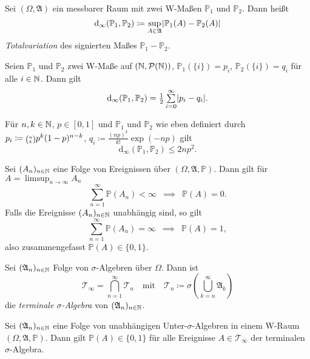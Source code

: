 \documentclass{cheat-sheet}
\newcommand{\Alg}{\mathfrak{A}} %
\renewcommand{\P}{\mathbb{P}} %
\let\myBinom\binom
\renewcommand{\binom}[2]{\mathsmaller{\myBinom{#1}{#2}}}
\begin{document}

\begin{defn}
  Sei $(\Omega, \Alg)$ ein messbarer Raum mit zwei W-Maßen $\P_1$ und $\P_2$. Dann heißt
  \[ \mathrm{d}_\infty(\P_1, \P_2) \coloneqq \sup_{A \in \Alg} \abs{\P_1(A) - \P_2(A)} \]
  \emph{Totalvariation} des signierten Maßes $\P_1 - \P_2$.
\end{defn}

\begin{satz}
  Seien $\P_1$ und $\P_2$ zwei W-Maße auf $(\mathbb{N}, \mathcal{P}(\mathbb{N}))$, $\P_1(\{ i \}) = p_i$, $\P_2(\{ i \}) = q_i$ für alle $i \in \mathbb{N}$. Dann gilt
  \[ \mathrm{d}_\infty(\P_1, \P_2) = \tfrac{1}{2} \sum_{i=0}^\infty \abs{p_i - q_i}. \]
\end{satz}

\begin{lem}
  Für $n, k \in \mathbb{N}$, $p \in \left[0,1\right]$ und $\P_1$ und $\P_2$ wie eben definiert durch $p_i \coloneqq \binom{n}{k} p^k (1-p)^{n-k}$, $q_i \coloneqq \tfrac{(np)^k}{k!} \exp(-np)$ gilt
  \[ \mathrm{d}_\infty(\P_1, \P_2) \leq 2 n p^2. \]
\end{lem}


\begin{lem}
  Sei $(A_n)_{n \in \mathbb{N}}$ eine Folge von Ereignissen über $(\Omega, \Alg, \P)$. Dann gilt für $A = \limsup_{n \to \infty} A_n$
  \[ \sum_{n=1}^\infty \P(A_n) < \infty \enspace \implies \enspace \P(A) = 0. \]
  Falls die Ereignisse $(A_n)_{n \in \mathbb{N}}$ unabhängig sind, so gilt
  \[ \sum_{n=1}^\infty \P(A_n) = \infty \enspace \implies \enspace \P(A) = 1, \]
  also zusammengefasst $\P(A) \in \{ 0, 1 \}$.
\end{lem}

\begin{defn}
  Sei $(\Alg_n)_{n \in \N}$ Folge von $\sigma$-Algebren über $\Omega$. Dann ist
  \[ \mathcal{T}_\infty = \bigcap_{n=1}^\infty \mathcal{T}_n \quad \text{mit} \quad \mathcal{T}_n \coloneqq \sigma \left( \bigcup_{k=n}^\infty \Alg_k \right) \]
  die \emph{terminale $\sigma$-Algebra} von $(\Alg_n)_{n \in \N}$.
\end{defn}


\begin{satz}
  Sei $(\Alg_n)_{n \in \N}$ eine Folge von unabhängigen Unter-$\sigma$-Algebren in einem W-Raum $(\Omega, \Alg, \P)$. Dann gilt $\P(A) \in \{ 0, 1 \}$ für alle Ereignisse $A \in \mathcal{T}_\infty$ der terminalen $\sigma$-Algebra.
\end{satz}
\end{document}
